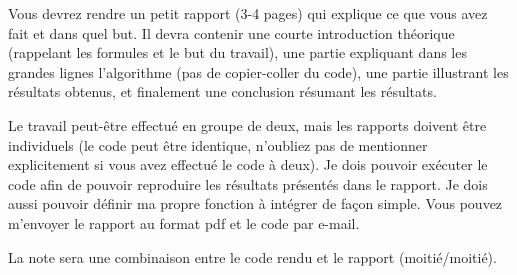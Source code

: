 \documentclass[a4paper,10pt]{article}
\begin{document}
Vous devrez rendre un petit rapport (3-4 pages) qui explique ce que vous avez fait et dans quel but. Il devra contenir
une courte introduction théorique (rappelant les formules et le but du travail), une partie expliquant dans les grandes lignes 
l'algorithme (pas de copier-coller du code), une partie illustrant les résultats obtenus, et finalement
une conclusion résumant les résultats.

Le travail peut-être effectué en groupe de deux, mais les rapports doivent être individuels 
(le code peut être identique, n'oubliez pas de mentionner 
explicitement si vous avez effectué le code à deux).  Je dois pouvoir exécuter le code
afin de pouvoir reproduire les résultats présentés dans le rapport. Je dois aussi pouvoir 
définir ma propre fonction à intégrer de façon simple.
Vous pouvez m'envoyer le rapport au format pdf et le code par e-mail.

La note sera une combinaison entre le code rendu et le rapport (moitié/moitié). 
\end{document}
